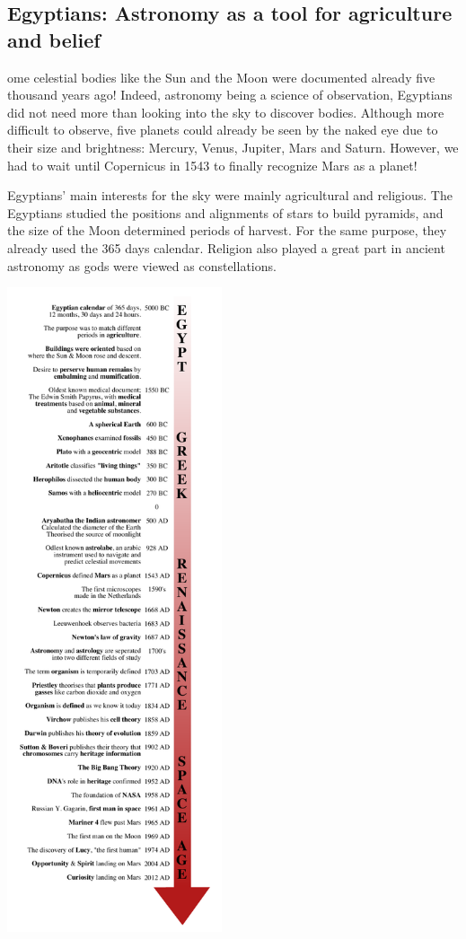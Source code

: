 \subsection{Egyptians: Astronomy as a tool for agriculture and belief}
ome celestial bodies like the Sun and the Moon were documented already five thousand years ago!
Indeed, astronomy being a science of observation, Egyptians did not need more than looking into the sky to discover bodies.
Although more difficult to observe, five planets could already be seen by the naked eye due to their size and brightness:
Mercury, Venus, Jupiter, Mars and Saturn.
However, we had to wait until Copernicus in 1543 to finally recognize Mars as a planet!

Egyptians' main interests for the sky were mainly agricultural and religious.
The Egyptians studied the positions and alignments of stars to build pyramids, and the size of the Moon determined periods of harvest.
For the same purpose, they already used the 365 days calendar.
Religion also played a great part in ancient astronomy as gods were viewed as constellations.
\cite{Egyptians}

\begin{center}
	\includegraphics[width=0.475\textwidth]{timeline.pdf}
\end{center}

